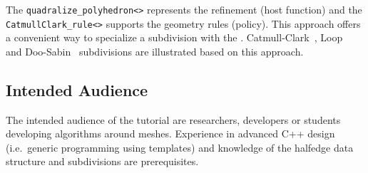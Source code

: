 \documentclass[letter,twocolumn]{article}
\begin{document}
The \lstinline!quadralize_polyhedron<>! represents the refinement
(host function) and the \lstinline!CatmullClark_rule<>! supports the
geometry rules (policy).  This approach offers a convenient way to
specialize a subdivision with the .
Catmull-Clark~\cite{cc}, Loop~\cite{loop} and Doo-Sabin~\cite{ds}
subdivisions are illustrated based on this approach.

\subsection*{Intended Audience}

The intended audience of the tutorial are researchers, developers or
students developing algorithms around meshes. Experience in advanced
C++ design (i.e.\ generic programming using templates) and knowledge
of the halfedge data structure and subdivisions are prerequisites.

{\footnotesize


}
\end{document}
